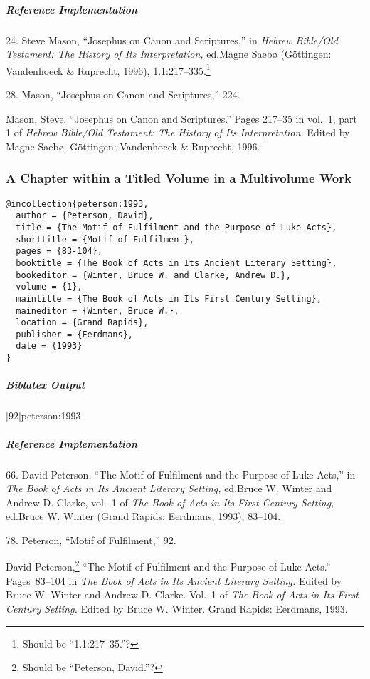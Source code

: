\documentclass[a4paper]{article}
\newenvironment{biboutput}{%
  \subparagraph{Biblatex Output}
}{\color{black}}
\newenvironment{refimp}{%
  \subparagraph{Reference Implementation}
  \color{reference-colour}
  \rm
}{\par\color{black}}
\begin{document}
\begin{refimp}
  \hspace*{\bibindent}24. Steve Mason, “Josephus on Canon and Scriptures,” in
  \emph{Hebrew Bible\slash Old Testament: The History of Its Interpretation,}
  ed.\@ Magne Saebø (Göttingen: Vandenhoeck \& Ruprecht, 1996),
  1.1:217–335.\footnote{Should be “1.1:217–35.”?}

  \hspace*{\bibindent}28. Mason, “Josephus on Canon and Scriptures,” 224.

  \hangindent\bibindent Mason, Steve. “Josephus on Canon and Scriptures.”
  Pages 217–35 in vol.~1, part 1 of \emph{Hebrew Bible\slash Old Testament:
  The History of Its Interpretation.} Edited by Magne Saebø. Göttingen:
  Vandenhoeck \& Ruprecht, 1996.
\end{refimp}

\subsubsection{A Chapter within a Titled Volume in a Multivolume Work}

\begin{lstlisting}
@incollection{peterson:1993,
  author = {Peterson, David},
  title = {The Motif of Fulfilment and the Purpose of Luke-Acts},
  shorttitle = {Motif of Fulfilment},
  pages = {83-104},
  booktitle = {The Book of Acts in Its Ancient Literary Setting},
  bookeditor = {Winter, Bruce W. and Clarke, Andrew D.},
  volume = {1},
  maintitle = {The Book of Acts in Its First Century Setting},
  maineditor = {Winter, Bruce W.},
  location = {Grand Rapids},
  publisher = {Eerdmans},
  date = {1993}
}
\end{lstlisting}  

\begin{biboutput}
  [92]{peterson:1993}
\end{biboutput}

\begin{refimp}
  \hspace*{\bibindent}66. David Peterson, “The Motif of Fulfilment and the
  Purpose of Luke-Acts,” in \emph{The Book of Acts in Its Ancient Literary
  Setting,} ed.\@ Bruce W. Winter and Andrew D. Clarke, vol.~1 of \emph{The
  Book of Acts in Its First Century Setting,} ed.\@ Bruce W. Winter (Grand
  Rapids: Eerdmans, 1993), 83–104.

  \hspace*{\bibindent}78. Peterson, “Motif of Fulfilment,” 92.

  \hangindent\bibindent David Peterson,\footnote{Should be “Peterson,
  David.”?} “The Motif of Fulfilment and the Purpose of Luke-Acts.”
  Pages~83–104 in \emph{The Book of Acts in Its Ancient Literary Setting.}
  Edited by Bruce W. Winter and Andrew D. Clarke. Vol.~1 of \emph{The Book of
  Acts in Its First Century Setting.} Edited by Bruce W. Winter. Grand Rapids:
  Eerdmans, 1993.
\end{refimp}
\end{document}
